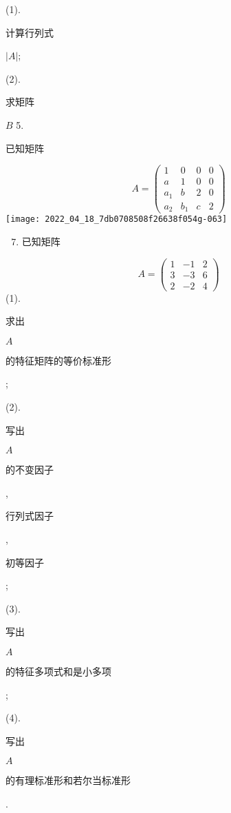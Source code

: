 \documentclass[10pt]{article}
\begin{document}
(1). \begin{CJK}{UTF8}{mj}计算行列式\end{CJK} $|A|$;

(2). \begin{CJK}{UTF8}{mj}求矩阵\end{CJK} $B$ 5. \begin{CJK}{UTF8}{mj}已知矩阵\end{CJK}
$$
A=\left(\begin{array}{llll}
1 & 0 & 0 & 0 \\
a & 1 & 0 & 0 \\
a_{1} & b & 2 & 0 \\
a_{2} & b_{1} & c & 2
\end{array}\right)
$$
\texttt{[image: 2022\_04\_18\_7db0708508f26638f054g-063]}

\begin{enumerate}
  \setcounter{enumi}{6}
  \item \begin{CJK}{UTF8}{mj}已知矩阵\end{CJK}
\end{enumerate}
$$
A=\left(\begin{array}{rrr}
1 & -1 & 2 \\
3 & -3 & 6 \\
2 & -2 & 4
\end{array}\right)
$$
(1). \begin{CJK}{UTF8}{mj}求出\end{CJK} $A$ \begin{CJK}{UTF8}{mj}的特征矩阵的等价标准形\end{CJK};

(2). \begin{CJK}{UTF8}{mj}写出\end{CJK} $A$ \begin{CJK}{UTF8}{mj}的不变因子\end{CJK}, \begin{CJK}{UTF8}{mj}行列式因子\end{CJK}, \begin{CJK}{UTF8}{mj}初等因子\end{CJK};

(3). \begin{CJK}{UTF8}{mj}写出\end{CJK} $A$ \begin{CJK}{UTF8}{mj}的特征多项式和是小多项\end{CJK};

(4). \begin{CJK}{UTF8}{mj}写出\end{CJK} $A$ \begin{CJK}{UTF8}{mj}的有理标准形和若尔当标准形\end{CJK}.
\end{document}
